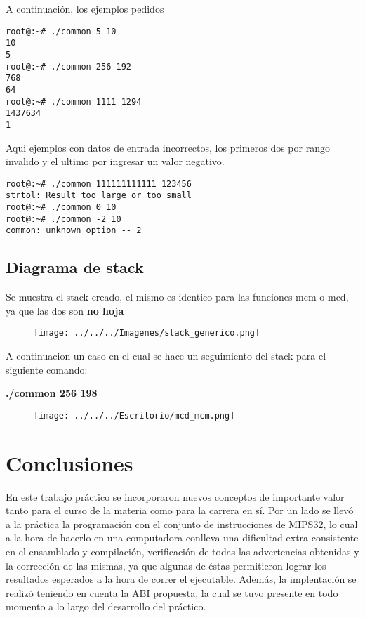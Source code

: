\documentclass[a4paper,10pt]{article}
\begin{document}
A continuación, los ejemplos pedidos
\begin{lstlisting}[style=MyFrame]
root@:~# ./common 5 10
10
5
root@:~# ./common 256 192
768
64
root@:~# ./common 1111 1294
1437634
1
\end{lstlisting}

Aqui ejemplos con datos de entrada incorrectos, los primeros dos por rango invalido y el ultimo por ingresar un valor negativo.
\begin{lstlisting}[style=MyFrame]
root@:~# ./common 111111111111 123456
strtol: Result too large or too small
root@:~# ./common 0 10
root@:~# ./common -2 10              
common: unknown option -- 2

\end{lstlisting}

\subsection{Diagrama de stack}

Se muestra el stack creado, el mismo es identico para las funciones mcm o mcd, ya que las dos son \textbf{no hoja} 

\begin{figure}[!htp]
\centering
\texttt{[image: ../../../Imagenes/stack\_generico.png]} 
\end{figure}

A continuacion un caso en el cual se hace un seguimiento del stack para el siguiente comando:

\textbf{./common 256 198} 

\begin{figure}[!htp]
\centering
\texttt{[image: ../../../Escritorio/mcd\_mcm.png]} 
\end{figure}
\newpage

\section{Conclusiones}

En este trabajo práctico se incorporaron nuevos conceptos de importante valor tanto para el curso de la materia como para la carrera en sí. Por un lado se llevó a la práctica la programación con el conjunto de instrucciones de MIPS32, lo cual a la hora de hacerlo en una computadora conlleva una dificultad extra consistente en  el ensamblado y compilación, verificación de todas las advertencias obtenidas y la corrección de las mismas, ya que algunas de éstas permitieron lograr los resultados esperados a la hora de correr el ejecutable. Además, la implentación se realizó teniendo en cuenta la ABI propuesta, la cual se tuvo presente en todo momento a lo largo del desarrollo del práctico.
\end{document}
